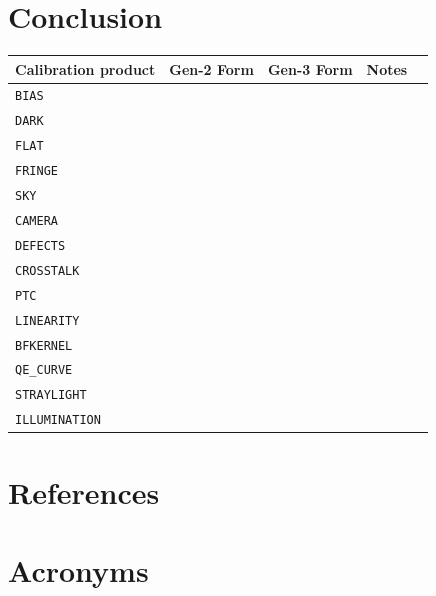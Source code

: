 \documentclass[DM,authoryear,toc]{lsstdoc}
\begin{document}
\section{Conclusion}


\appendix

\begin{tabular}{l |c|c|l|l}
  Calibration product & Gen-2 Form & Gen-3 Form & Notes \\
  \hline
  \verb|BIAS| & & & \\
  \verb|DARK| & & & \\
  \verb|FLAT| & & & \\
  \verb|FRINGE| & & & \\
  \verb|SKY| & & & \\
  \verb|CAMERA| & & & \\
  \verb|DEFECTS| & & & \\
  \verb|CROSSTALK| & & & \\
  \verb|PTC| & & & \\
  \verb|LINEARITY| & & & \\
  \verb|BFKERNEL| & & & \\
  \verb|QE_CURVE| & & & \\
  \verb|STRAYLIGHT| & & & \\
  \verb|ILLUMINATION| & & & \\
\end{tabular}

\section{References} \label{sec:bib}


\section{Acronyms} \label{sec:acronyms}

\end{document}
